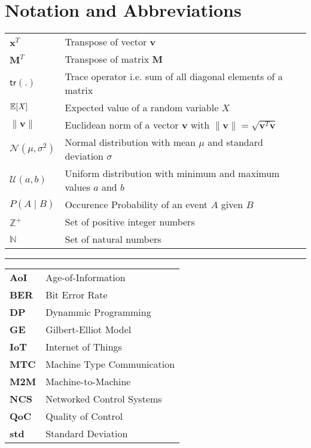 \chapter*{Notation and Abbreviations}

\begin{tabular}{p{2cm} l} 
$\mathbf{x}^T$ & Transpose of vector $\mathbf{v}$\\
$\mathbf{M}^T$ & Transpose of matrix $\mathbf{M}$\\
$\mathsf{tr(.)}$ & Trace operator i.e. sum of all diagonal elements of a matrix\\
$\mathbb{E}[\mathit{X}]$ & Expected value of a random variable $\mathit{X}$\\
$\|\mathbf{v}\|$ & Euclidean norm of a vector $\mathbf{v}$ with $\|\mathbf{v}\|=\sqrt{\mathbf{v} ^T\mathbf{v}}$\\
$\mathcal{N}(\mu,\sigma^2)$ & Normal distribution with mean $\mu$ and standard deviation $\sigma$\\
$\mathcal{U}(a,b)$ & Uniform distribution with minimum and maximum values $a$ and $b$\\
$P(A \mid B)$ & Occurence Probability of an event $A$ given $B$\\
$\mathbb{Z}^+$ & Set of positive integer numbers\\
$\mathbb{N}$ & Set of natural numbers\\
\end{tabular}
\vspace{1cm}

\hrule
\vspace{1cm}
  
\begin{tabular}{>{\bfseries}p{2cm} l}
AoI & Age-of-Information\\
BER & Bit Error Rate\\
DP & Dynammic Programming\\
GE & Gilbert-Elliot Model\\
IoT & Internet of Things\\
MTC & Machine Type Communication\\
M2M & Machine-to-Machine\\
NCS & Networked Control Systems\\
QoC & Quality of Control\\
std & Standard Deviation\\
\end{tabular}

